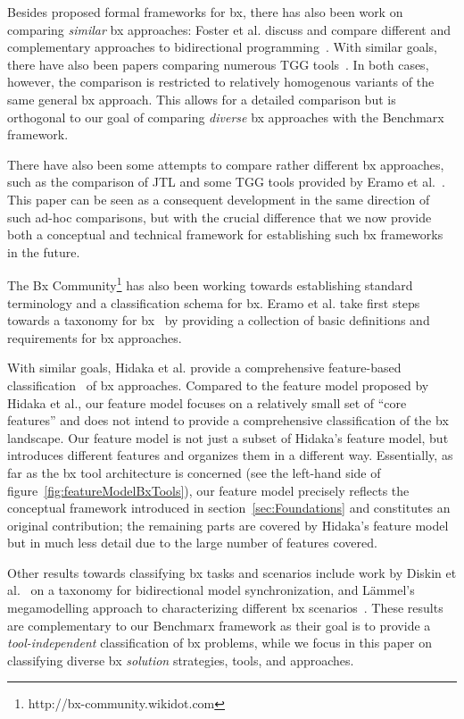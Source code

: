 Besides proposed formal frameworks for bx, there has also been work on comparing \emph{similar} bx approaches:  Foster et al. discuss and compare different and complementary approaches to bidirectional programming~\cite{DBLP:conf/ssgip/FosterMV10}.
With similar goals, there have also been papers comparing numerous TGG tools~\cite{DBLP:journals/eceasst/HildebrandtLGRGSLAS13,DBLP:journals/eceasst/LeblebiciASHRG14}.
In both cases, however, the comparison is restricted to relatively homogenous variants of the same general bx approach.
This allows for a detailed comparison but is orthogonal to our goal of comparing \emph{diverse} bx approaches with the Benchmarx framework.

There have also been some attempts to compare rather different bx approaches, such as the comparison of JTL and some TGG tools provided by Eramo et al.~\cite{DBLP:journals/eceasst/EramoB13}.
This paper can be seen as a consequent development in the same direction of such ad-hoc comparisons, but with the crucial difference that we now provide both a conceptual and technical framework for establishing such bx frameworks in the future.  

The Bx Community\footnote{http://bx-community.wikidot.com} has also been working towards establishing standard terminology and a classification schema for bx.
Eramo et al. take first steps towards a taxonomy for bx~\cite{DBLP:conf/sattose/EramoMP14} by providing a collection of basic definitions and requirements for bx approaches.

With similar goals, Hidaka et al. provide a comprehensive feature-based classification~\cite{SOSYM-Hidaka2016} of bx approaches.
Compared to the feature model proposed by Hidaka et al., our feature model focuses on a relatively small set of ``core features'' and does not intend to provide a comprehensive classification of the bx landscape.
Our feature model is not just a subset of Hidaka's feature model, but introduces different features and organizes them in a different way.
Essentially, as far as the bx tool architecture is concerned (see the left-hand side of figure~\ref{fig:featureModelBxTools}), our feature model precisely reflects the conceptual framework introduced in section~\ref{sec:Foundations} and constitutes an original contribution; the remaining parts are covered by Hidaka's feature model but in much less detail due to the large number of features covered.

Other results towards classifying bx tasks and scenarios include work by Diskin et al.~\cite{DBLP:journals/jss/DiskinGWC16} on a taxonomy for bidirectional model synchronization, and L\"ammel's megamodelling approach to characterizing different bx scenarios~\cite{DBLP:conf/sle/Lammel16}.
These results are complementary to our Benchmarx framework as their goal is to provide a \emph{tool-independent} classification of bx problems, while we focus in this paper on classifying diverse bx \emph{solution} strategies, tools, and approaches.   

